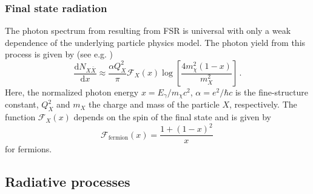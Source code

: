 \documentclass[10pt,aps,pra,reprint,amsmath,amsfonts,amssymb,showpacs]{revtex4-1}
\newcommand{\rmn}{\mathrm}
\newcommand{\dd}{\mathrm{d}}
\newcommand{\eg}{E_\gamma}
\begin{document}
\subsubsection{Final state radiation}
The photon spectrum from resulting from FSR is universal with only a
weak dependence of the underlying particle physics model. The photon
yield from this process is given by (see
e.g. \cite{2008JHEP...01..049B})
\begin{equation}
\frac{\dd N_{X \bar{X}}}{\dd x} \approx \frac{\alpha Q_X^2}{\pi}
\mathcal{F}_X(x) \log\left[\frac{4 m_\chi^2\left(1-x\right)}{m_X^2}\right]\,.
\end{equation}
Here, the normalized photon energy $x=\eg/m_\chi c^2$, $\alpha =
e^2/\hbar c$ is the fine-structure constant, $Q_X^2$ and $m_X$ the
charge and mass of the particle $X$, respectively. The function
$\mathcal{F}_X(x)$ depends on the spin of the final state and is given
by
\begin{equation}
\mathcal{F}_\rmn{fermion}(x) = \frac{1+\left(1-x\right)^2}{x}\,
\end{equation}
for fermions. 


\subsection{Radiative processes}
\end{document}
